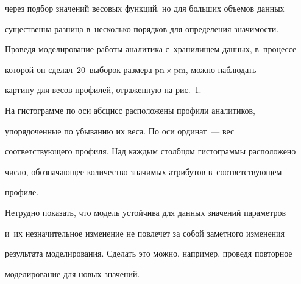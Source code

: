через подбор значений весовых функций, но для больших объемов данных 


существенна разница в~несколько порядков для определения значимости. 


Проведя моделирование работы аналитика с~хранилищем данных, в~процессе 


которой он сделал~20~выборок размера $\mathrm{pn}\times \mathrm{pm}$, можно наблюдать 


картину для весов профилей, отраженную на рис.~1.











  На гистограмме по оси абсцисс расположены профили аналитиков, 


упорядоченные по убыванию их веса. По оси ординат~--- вес 


соответствующего профиля. Над каждым столбцом гистограммы расположено 


число, обозначающее количество значимых атрибутов в~соответствующем 


профиле.








  


  Нетрудно показать, что модель устойчива для данных значений параметров 


и~их незначительное изменение не повлечет за собой заметного изменения 


результата моделирования. Сделать это можно, например, проведя повторное 


моделирование для новых значений.





